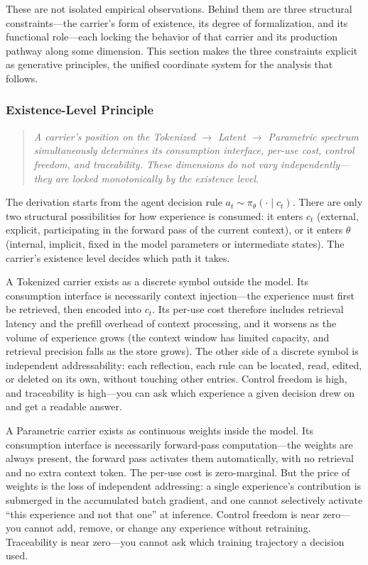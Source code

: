 These are not isolated empirical observations. Behind them are three structural constraints---the carrier's form of existence, its degree of formalization, and its functional role---each locking the behavior of that carrier and its production pathway along some dimension. This section makes the three constraints explicit as generative principles, the unified coordinate system for the analysis that follows.

\subsubsection{Existence-Level Principle}
\label{sec:existence-principle}

\begin{quote}\itshape
A carrier's position on the Tokenized $\rightarrow$ Latent $\rightarrow$ Parametric spectrum simultaneously determines its consumption interface, per-use cost, control freedom, and traceability. These dimensions do not vary independently---they are locked monotonically by the existence level.
\end{quote}

The derivation starts from the agent decision rule $a_t \sim \pi_\theta(\cdot \mid c_t)$. There are only two structural possibilities for how experience is consumed: it enters $c_t$ (external, explicit, participating in the forward pass of the current context), or it enters $\theta$ (internal, implicit, fixed in the model parameters or intermediate states). The carrier's existence level decides which path it takes.

A Tokenized carrier exists as a discrete symbol outside the model. Its consumption interface is necessarily context injection---the experience must first be retrieved, then encoded into $c_t$. Its per-use cost therefore includes retrieval latency and the prefill overhead of context processing, and it worsens as the volume of experience grows (the context window has limited capacity, and retrieval precision falls as the store grows). The other side of a discrete symbol is independent addressability: each reflection, each rule can be located, read, edited, or deleted on its own, without touching other entries. Control freedom is high, and traceability is high---you can ask which experience a given decision drew on and get a readable answer.

A Parametric carrier exists as continuous weights inside the model. Its consumption interface is necessarily forward-pass computation---the weights are always present, the forward pass activates them automatically, with no retrieval and no extra context token. The per-use cost is zero-marginal. But the price of weights is the loss of independent addressing: a single experience's contribution is submerged in the accumulated batch gradient, and one cannot selectively activate ``this experience and not that one'' at inference. Control freedom is near zero---you cannot add, remove, or change any experience without retraining. Traceability is near zero---you cannot ask which training trajectory a decision used.

